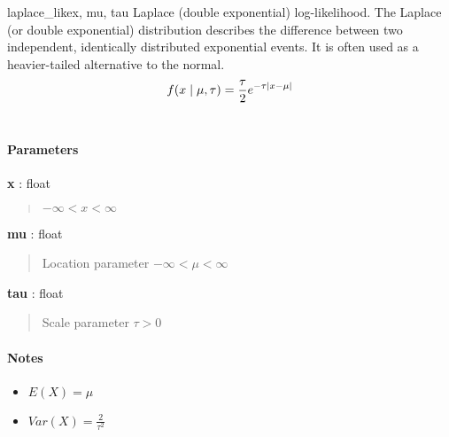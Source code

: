 \hypertarget{pymc.distributions.laplace_like}{}
\begin{funcdesc}{laplace\_like}{x, mu, tau}
Laplace (double exponential) log-likelihood. The Laplace (or double exponential) distribution describes the
difference between two independent, identically distributed exponential
events. It is often used as a heavier-tailed alternative to the normal.
\begin{gather}
\begin{split}f(x \mid \mu, \tau) = \frac{\tau}{2}e^{-\tau|x-\mu|}\end{split}\notag\\\begin{split}\end{split}\notag
\end{gather}\paragraph{Parameters}\begin{paramlist}

\item[] \textbf{x} : float
\begin{quote}

$-\infty < x < \infty$
\end{quote}

\item[] \textbf{mu} : float
\begin{quote}

Location parameter $-\infty < \mu < \infty$
\end{quote}

\item[] \textbf{tau} : float
\begin{quote}

Scale parameter $\tau > 0$
\end{quote}
\end{paramlist}
\paragraph{Notes}
\begin{itemize}
\item {} 
$E(X) = \mu$

\item {} 
$Var(X) = \frac{2}{\tau^2}$

\end{itemize}
\end{funcdesc}

